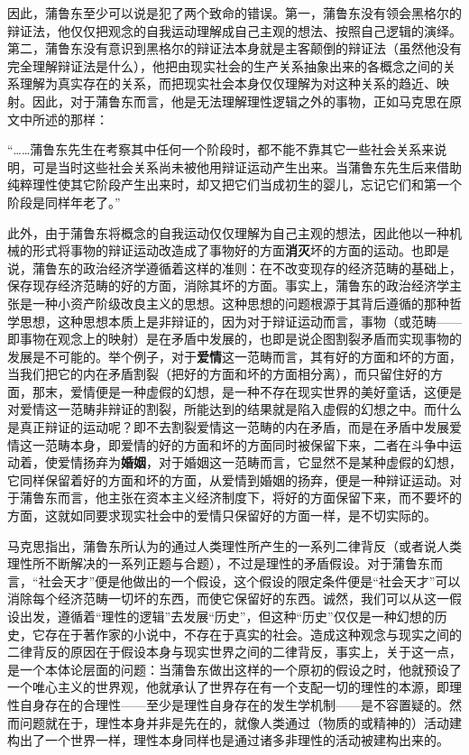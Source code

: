 \documentclass[a4paper,twoside,12pt,AutoFakeBold]{ctexart}
\begin{document}
因此，蒲鲁东至少可以说是犯了两个致命的错误。第一，蒲鲁东没有领会黑格尔的辩证法，他仅仅把观念的自我运动理解成自己主观的想法、按照自己逻辑的演绎。第二，蒲鲁东没有意识到黑格尔的辩证法本身就是主客颠倒的辩证法（虽然他没有完全理解辩证法是什么），他把由现实社会的生产关系抽象出来的各概念之间的关系理解为真实存在的关系，而把现实社会本身仅仅理解为对这种关系的趋近、映射。因此，对于蒲鲁东而言，他是无法理解理性逻辑之外的事物，正如马克思在原文中所述的那样：

\begin{fangsong}
“……蒲鲁东先生在考察其中任何一个阶段时，都不能不靠其它一些社会关系来说明，可是当时这些社会关系尚未被他用辩证运动产生出来。当蒲鲁东先生后来借助纯粹理性使其它阶段产生出来时，却又把它们当成初生的婴儿，忘记它们和第一个阶段是同样年老了。”
\end{fangsong}

此外，由于蒲鲁东将概念的自我运动仅仅理解为自己主观的想法，因此他以一种机械的形式将事物的辩证运动改造成了事物好的方面\textbf{消灭}坏的方面的运动。也即是说，蒲鲁东的政治经济学遵循着这样的准则：在不改变现存的经济范畴的基础上，保存现存经济范畴的好的方面，消除其坏的方面。事实上，蒲鲁东的政治经济学主张是一种小资产阶级改良主义的思想。这种思想的问题根源于其背后遵循的那种哲学思想，这种思想本质上是非辩证的，因为对于辩证运动而言，事物（或范畴——即事物在观念上的映射）是在矛盾中发展的，也即是说企图割裂矛盾而实现事物的发展是不可能的。举个例子，对于\textbf{爱情}这一范畴而言，其有好的方面和坏的方面，当我们把它的内在矛盾割裂（把好的方面和坏的方面相分离），而只留住好的方面，那末，爱情便是一种虚假的幻想，是一种不存在现实世界的美好童话，这便是对爱情这一范畴非辩证的割裂，所能达到的结果就是陷入虚假的幻想之中。而什么是真正辩证的运动呢？即不去割裂爱情这一范畴的内在矛盾，而是在矛盾中发展爱情这一范畴本身，即爱情的好的方面和坏的方面同时被保留下来，二者在斗争中运动着，使爱情扬弃为\textbf{婚姻}，对于婚姻这一范畴而言，它显然不是某种虚假的幻想，它同样保留着好的方面和坏的方面，从爱情到婚姻的扬弃，便是一种辩证运动。对于蒲鲁东而言，他主张在资本主义经济制度下，将好的方面保留下来，而不要坏的方面，这就如同要求现实社会中的爱情只保留好的方面一样，是不切实际的。

马克思指出，蒲鲁东所认为的通过人类理性所产生的一系列二律背反（或者说人类理性所不断解决的一系列正题与合题），不过是理性的矛盾假设。对于蒲鲁东而言，“社会天才”便是他做出的一个假设，这个假设的限定条件便是“社会天才”可以消除每个经济范畴一切坏的东西，而使它保留好的东西。诚然，我们可以从这一假设出发，遵循着“理性的逻辑”去发展“历史”，但这种“历史”仅仅是一种幻想的历史，它存在于著作家的小说中，不存在于真实的社会。造成这种观念与现实之间的二律背反的原因在于假设本身与现实世界之间的二律背反，事实上，关于这一点，是一个本体论层面的问题：当蒲鲁东做出这样的一个原初的假设之时，他就预设了一个唯心主义的世界观，他就承认了世界存在有一个支配一切的理性的本源，即理性自身存在的合理性——至少是理性自身存在的发生学机制——是不容置疑的。然而问题就在于，理性本身并非是先在的，就像人类通过（物质的或精神的）活动建构出了一个世界一样，理性本身同样也是通过诸多非理性的活动被建构出来的。
\end{document}

